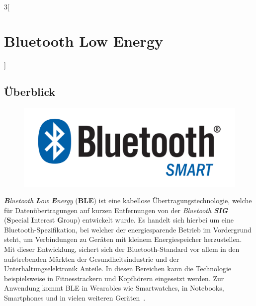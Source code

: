 \begin{multicols}{3}[\section{Bluetooth Low Energy}]
\subsection*{Überblick}
\begin{figure}
  \vspace{-20pt}
  \begin{center}
  	\hspace{-20pt}
    \includegraphics[width=0.7\linewidth]{Kapitel/BLE/Grafiken/Bluetooth_Smart_Logo.png}
  \end{center}
  \vspace{-15pt}
\end{figure}
\textit{\textbf{B}luetooth \textbf{L}ow \textbf{E}nergy} (\textbf{BLE}) ist eine kabellose Übertragungstechnologie, welche für Datenübertragungen auf kurzen Entfernungen von der \textit{Bluetooth \textbf{SIG}} (\textbf{S}pecial \textbf{I}nterest \textbf{G}roup) entwickelt wurde. Es handelt sich hierbei um eine Bluetooth-Spezifikation, bei welcher der energiesparende Betrieb im Vordergrund steht, um Verbindungen zu Geräten mit kleinem Energiespeicher herzustellen. Mit dieser Entwicklung, sichert sich der Bluetooth-Standard vor allem in den aufstrebenden Märkten der Gesundheitsindustrie und der Unterhaltungselektronik Anteile. In diesen Bereichen kann die Technologie beispielsweise in Fitnesstrackern und Kopfhörern eingesetzt werden. 
Zur Anwendung kommt BLE in Wearables wie Smartwatches, in Notebooks, Smartphones und in vielen weiteren Geräten~\cite{BLE.4}.

\end{multicols}
